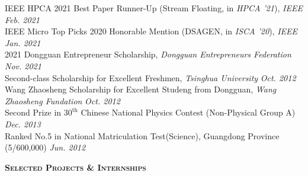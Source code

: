 \documentclass[a4paper]{article}
\newenvironment{changemargin}[2]{%
  \begin{list}{}{%
    \setlength{\topsep}{0pt}%
    \setlength{\leftmargin}{#1}%
    \setlength{\rightmargin}{#2}%
    \setlength{\listparindent}{\parindent}%
    \setlength{\itemindent}{\parindent}%
    \setlength{\parsep}{\parskip}%
  }%
  \item[]}{\end{list}
}
\newcommand{\lineover}{
	\begin{changemargin}{-0.05in}{-0.05in}
		\vspace*{-8pt}
		\hrulefill \\
		\vspace*{-2pt}
	\end{changemargin}
}
\newcommand{\header}[1]{
	\begin{changemargin}{-0.5in}{-0.5in}
		\scshape{\textbf{#1}}\\
  	\lineover
	\end{changemargin}
}
\newenvironment{body} {
	\vspace*{-16pt}
	\begin{changemargin}{-0.25in}{-0.5in}
  }	
	{\end{changemargin}
}
\begin{document}
\begin{body}
	\vspace{14pt}
	IEEE HPCA 2021 Best Paper Runner-Up (Stream Floating, in \emph{HPCA '21}), \emph{IEEE} \hfill{} \emph{Feb. 2021}\\
	\smallskip
	IEEE Micro Top Picks 2020 Honorable Mention (DSAGEN, in \emph{ISCA '20}), \emph{IEEE} \hfill{} \emph{Jan. 2021}\\
	\smallskip
	2021 Dongguan Entrepreneur Scholarship, \emph{Dongguan Entrepreneurs Federation} \hfill{} \emph{Nov. 2021}\\
	\smallskip
	Second-class Scholarship for Excellent Freshmen, \emph{Tsinghua University} \hfill{} \emph{Oct. 2012}\\
	\smallskip
	Wang Zhaosheng Scholarship for Excellent Studeng from Dongguan, \emph{Wang Zhaosheng Fundation} \hfill{} \emph{Oct. 2012}\\
	\smallskip
	Second Prize in $30^{\mathrm{th}}$ Chinese National Physics Contest (Non-Physical Group A) \hfill{} \emph{Dec. 2013}\\
	\smallskip
	Ranked No.5 in National Matriculation Test(Science), Guangdong Province (5/600,000) \hfill{} \emph{Jun. 2012}
\end{body}

\smallskip
\smallskip

\header{Selected Projects \& Internships}
\end{document}
